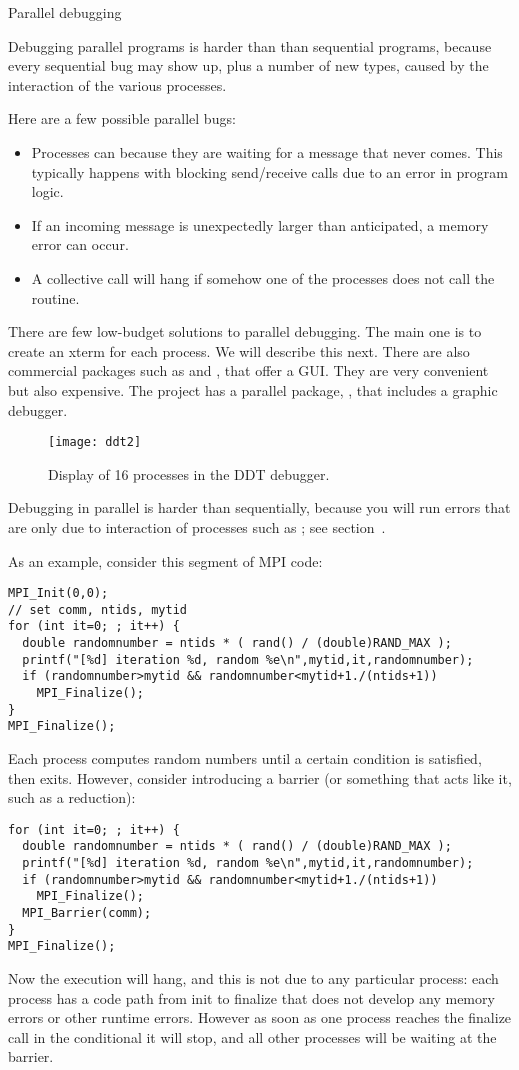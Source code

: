  {Parallel debugging}

Debugging parallel programs is harder than than sequential
programs, because every sequential bug may show up, plus a number
of new types, caused by the interaction of the various processes.

Here are a few possible parallel bugs:
\begin{itemize}
\item Processes can  because they are waiting for
  a message that never comes. This typically happens with blocking
  send/receive calls due to an error in program logic.
\item If an incoming message is unexpectedly larger than anticipated,
  a memory error can occur.
\item A collective call will hang if somehow one of the processes does
  not call the routine.
\end{itemize}

There are few low-budget solutions to parallel debugging. The main one
is to create an xterm for each process. We will describe this next.
There are also commercial packages such as  and
, that offer a GUI. They are very convenient but
also expensive. The  project has a parallel package, 
, that includes a graphic debugger.

\begin{figure}[ht]
\texttt{[image: ddt2]}
\caption{Display of 16 processes in the DDT debugger.}
\label{fig:ddt2}
\end{figure}

Debugging in parallel is harder than sequentially, because you will run
errors that are only due to interaction of processes such as ;
see section~.

As an example, consider this segment of MPI code:
\begin{verbatim}
MPI_Init(0,0);
// set comm, ntids, mytid
for (int it=0; ; it++) {
  double randomnumber = ntids * ( rand() / (double)RAND_MAX );
  printf("[%d] iteration %d, random %e\n",mytid,it,randomnumber);
  if (randomnumber>mytid && randomnumber<mytid+1./(ntids+1))  
    MPI_Finalize();
}
MPI_Finalize();
\end{verbatim}
Each process computes random numbers until a certain condition is satisfied, then exits.
However, consider introducing a barrier (or something that acts like it, such as a reduction):
\begin{verbatim}
for (int it=0; ; it++) {
  double randomnumber = ntids * ( rand() / (double)RAND_MAX );
  printf("[%d] iteration %d, random %e\n",mytid,it,randomnumber);
  if (randomnumber>mytid && randomnumber<mytid+1./(ntids+1))  
    MPI_Finalize();
  MPI_Barrier(comm);
}
MPI_Finalize();
\end{verbatim}
Now the execution will hang, and this is not due to any particular process:
each process has a code path from init to finalize that does not develop
any memory errors or other runtime errors.
However as soon as one process reaches the finalize call in the conditional
it will stop, and all other processes will be waiting at the barrier.

